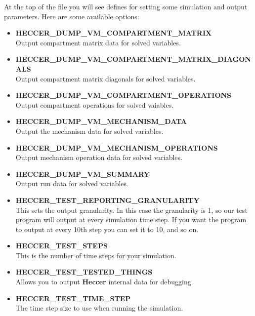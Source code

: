 \documentclass[12pt]{article}
\begin{document}
At the top of the file you will see defines for setting some simulation and output parameters. Here are some available options:

\begin{itemize}
   \item[]{\bf HECCER\_DUMP\_VM\_COMPARTMENT\_MATRIX} \\
      Output compartment matrix data for solved variables.

   \item[]{\bf HECCER\_DUMP\_VM\_COMPARTMENT\_MATRIX\_DIAGONALS} \\
      Output compartment matrix diagonals for solved variables.

   \item[]{\bf HECCER\_DUMP\_VM\_COMPARTMENT\_OPERATIONS} \\
      Output compartment operations for solved vaiables.

   \item[]{\bf HECCER\_DUMP\_VM\_MECHANISM\_DATA} \\
      Output the mechanism data for solved variables.

   \item[]{\bf HECCER\_DUMP\_VM\_MECHANISM\_OPERATIONS} \\
      Output mechanism operation data for solved variables.

   \item[]{\bf HECCER\_DUMP\_VM\_SUMMARY} \\
      Output run data for solved variables.

   \item[]{\bf HECCER\_TEST\_REPORTING\_GRANULARITY} \\
      This sets the output granularity. In this case the granularity is 1, so our test program will output at every simulation time step. If you want the program to output at every 10th step you can set it to 10, and so on.

   \item[]{\bf HECCER\_TEST\_STEPS} \\
      This is the number of time steps for your simulation.

   \item[]{\bf HECCER\_TEST\_TESTED\_THINGS} \\
      Allows you to output {\bf Heccer} internal data for debugging.

   \item[]{\bf HECCER\_TEST\_TIME\_STEP} \\
      The time step size to use when running the simulation.
\end{itemize}
\end{document}
